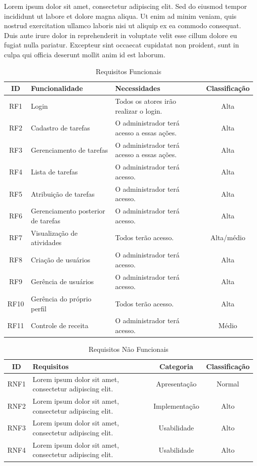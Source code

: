 \documentclass[
	12pt,				    %
	openright,			    %
	oneside,			    %
	a4paper,			    %
    sumario=tradicional,    %
	english,			    %
	brazilian,				    %
	]{abntex2}
\begin{document}
Lorem ipsum dolor sit amet, consectetur adipiscing elit. Sed do eiusmod tempor incididunt ut labore et dolore magna aliqua. Ut enim ad minim veniam, quis nostrud exercitation ullamco laboris nisi ut aliquip ex ea commodo consequat. Duis aute irure dolor in reprehenderit in voluptate velit esse cillum dolore eu fugiat nulla pariatur. Excepteur sint occaecat cupidatat non proident, sunt in culpa qui officia deserunt mollit anim id est laborum.

\begin{table}[H]
\centering
\begin{tabular}{|c|l|p{5cm}|c|}
\hline
\textbf{ID} & \textbf{Funcionalidade} & \textbf{Necessidades} & \textbf{Classificação} \\
\hline
RF1 & Login & Todos os atores irão realizar o login. & Alta \\
\hline
RF2 & Cadastro de tarefas & O administrador terá acesso a essas ações. & Alta \\
\hline
RF3 & Gerenciamento de tarefas & O administrador terá acesso a essas ações. & Alta \\
\hline
RF4 & Lista de tarefas & O administrador terá acesso. & Alta \\
\hline
RF5 & Atribuição de tarefas & O administrador terá acesso. & Alta \\
\hline
RF6 & Gerenciamento posterior de tarefas & O administrador terá acesso. & Alta \\
\hline
RF7 & Visualização de atividades & Todos terão acesso. & Alta/médio \\
\hline
RF8 & Criação de usuários & O administrador terá acesso. & Alta \\
\hline
RF9 & Gerência de usuários & O administrador terá acesso. & Alta \\
\hline
RF10 & Gerência do próprio perfil & Todos terão acesso. & Alta \\
\hline
RF11 & Controle de receita & O administrador terá acesso. & Médio \\
\hline
\end{tabular}
{\caption{Requisitos Funcionais}
\label{tab:requisitosFuncionais}}
\end{table}

\begin{table}[H]
\centering
\begin{tabular}{|c|p{7cm}|c|c|}
\hline
\textbf{ID} & \textbf{Requisitos} & \textbf{Categoria} & \textbf{Classificação} \\
\hline
RNF1 & Lorem ipsum dolor sit amet, consectetur adipiscing elit. & Apresentação & Normal \\
\hline
RNF2 & Lorem ipsum dolor sit amet, consectetur adipiscing elit. & Implementação   & Alto \\
\hline
RNF3 & Lorem ipsum dolor sit amet, consectetur adipiscing elit. & Usabilidade & Alto \\
\hline
RNF4 & Lorem ipsum dolor sit amet, consectetur adipiscing elit. & Usabilidade & Alto \\
\hline
\end{tabular}
{\caption{Requisitos Não Funcionais}\label{tab:requisitosNaoFuncionais}}

\end{table}
\end{document}
